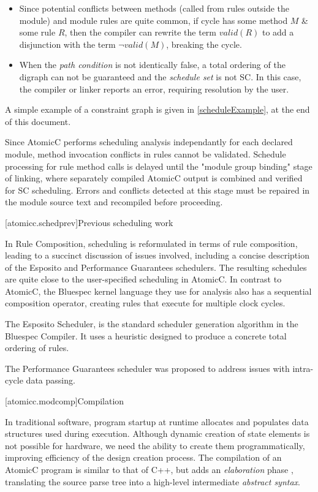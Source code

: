 \begin{itemize}
\item Since potential conflicts between methods (called from rules outside the module)
and module rules are quite common,
if cycle has some method $M$ \& some rule $R$, then the compiler can
rewrite the term $valid(R)$ to add a disjunction with the term $\neg valid(M)$, breaking
the cycle.

\item When the \textit{path condition} is not identically false, a total ordering of
the digraph can not be guaranteed and the \textit{schedule set} is not SC.
In this case, the compiler or linker reports an error,
requiring resolution by the user.
\end{itemize}

A simple example of a constraint graph is given in \ref{scheduleExample}, at the end of this document.

Since AtomicC performs scheduling analysis independantly for each
declared module, method invocation conflicts in rules cannot be validated.
Schedule processing for rule method calls is delayed until the "module group binding"
stage of linking, where separately compiled AtomicC output is combined and
verified
for SC scheduling.  Errors and conflicts detected at this stage must be repaired
in the module source text and recompiled before proceeding.

[atomicc.schedprev]{Previous scheduling work}

In Rule Composition\cite{Dave2007}, scheduling
is reformulated in terms of rule composition, leading to a succinct discussion
of issues involved, including a concise description of the Esposito and
Performance Guarantees schedulers.  The resulting schedules are quite close
to the user-specified scheduling in AtomicC.
In contrast to AtomicC, the Bluespec kernel language they use
for analysis also has a sequential composition operator, creating rules
that execute for multiple clock cycles.

The Esposito Scheduler\cite{Esposito:Patent,Dave2007},
is the standard scheduler generation algorithm in the Bluespec Compiler.
It uses a heuristic designed to produce a concrete total ordering of rules.

The Performance Guarantees scheduler\cite{Rosenband:PerformanceGuarantees}
was proposed to address issues with intra-cycle data passing.

\newpage
{}[atomicc.modcomp]{Compilation}

In traditional software, program startup at runtime allocates
and populates data structures used during execution.  Although dynamic
creation of state elements is not possible for hardware,
we need the ability to create them programmatically, improving
efficiency of the design creation process.
The compilation of an AtomicC program is similar to that of C++, but adds
an \textit{elaboration} phase \cite[Sec.~1]{Milner:1990}\cite{Gillenwater:2008,Memarian:2016,Pfenning},
translating the source parse tree into a high-level
intermediate \textit{abstract syntax}.

